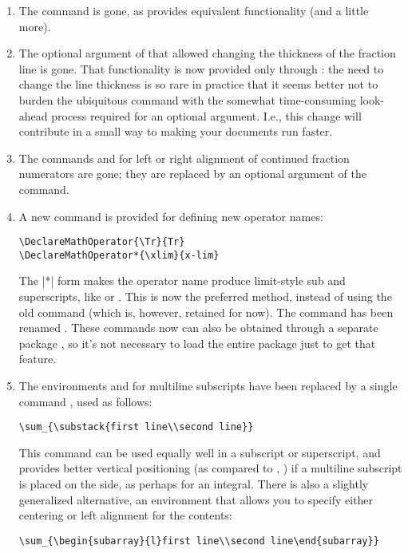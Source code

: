\documentclass{amsdtx}
\begin{document}
\begin{enumerate}
\item The  command is gone, as  provides
equivalent functionality (and a little more).

\item The optional argument of  that allowed changing the
thickness of the fraction line is gone. That functionality is now
provided only through : the need to change the line
thickness is so rare in practice that it seems better not to burden the
ubiquitous  command with the somewhat time-consuming look-ahead
process required for an optional argument. I.e., this change will
contribute in a small way to making your documents run faster.

\item The commands  and  for left or right
alignment of continued fraction numerators are gone; they are replaced
by an optional argument of the  command.

\item A new command  is provided for defining
new operator names:
\begin{verbatim}
\DeclareMathOperator{\Tr}{Tr}
\DeclareMathOperator*{\xlim}{x-lim}
\end{verbatim}
The |*| form makes the operator name produce limit-style sub and
superscripts, like  or . This is now the preferred
method, instead of using the old command  (which is,
however, retained for now). The command  has
been renamed . These commands now can also be obtained
through a separate package , so it's not necessary to load
the entire  package just to get that feature.

\item The environments  and  for multiline subscripts
have been replaced by a single command , used as follows:
\begin{verbatim}
\sum_{\substack{first line\\second line}}
\end{verbatim}
This command can be used equally well in a subscript or superscript, and
provides better vertical positioning (as compared to , )
if a multiline subscript is placed on the side, as perhaps for an
integral. There is also a slightly generalized alternative, an
environment  that allows you to specify either centering
or left alignment for the contents:
\begin{verbatim}
\sum_{\begin{subarray}{l}first line\\second line\end{subarray}}
\end{verbatim}


\end{enumerate}
\end{document}
